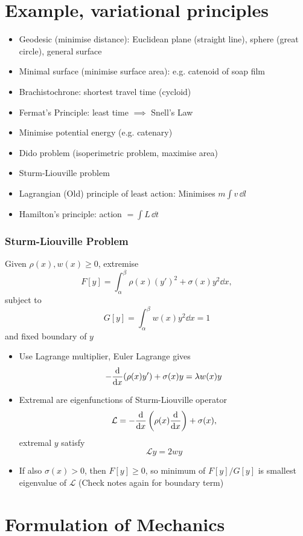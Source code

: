\section{Example, variational principles}
\begin{itemize}
    \item Geodesic (minimise distance): Euclidean plane (straight line), sphere (great circle), general surface
    \item Minimal surface (minimise surface area): e.g. catenoid of soap film
    \item Brachistochrone: shortest travel time (cycloid)
    \item Fermat's Principle: least time $\implies$ Snell's Law
    \item Minimise potential energy (e.g. catenary)
    \item Dido problem (isoperimetric problem, maximise area)
    \item Sturm-Liouville problem
    \item Lagrangian (Old) principle of least action: Minimises $m \int v \, \dd l$
    \item Hamilton's principle: action $= \int L \, \dd t$
\end{itemize}


\subsubsection*{Sturm-Liouville Problem}
Given $\rho(x), w(x) \geq 0$, extremise \[F[y] = \int_\alpha^\beta \rho(x) (y')^2 + \sigma(x) y^2 \dd x,\] subject to \[G[y] = \int_\alpha^\beta w(x)y^2 \dd{x} = 1\] and fixed boundary of $y$

\begin{itemize}
    \item Use Lagrange multiplier, Euler Lagrange gives \[ - \frac{\mathrm{d}{}}{\mathrm{d}{x}} (\rho(x) y') + \sigma(x) y = \lambda w(x) y\]
    \item Extremal are eigenfunctions of Sturm-Liouville operator \[\mathcal{L} = - \frac{\mathrm{d}{}}{\mathrm{d}{x}} \left( \rho(x) \frac{\mathrm{d}{}}{\mathrm{d}{x}} \right) + \sigma(x),\] extremal $y$ satisfy \[\mathcal{L}y = 2wy\]
    \item If also $\sigma(x) > 0$, then $F[y] \geq 0$, so minimum of $F[y]/G[y]$ is smallest eigenvalue of $\mathcal{L}$ (Check notes again for boundary term)
\end{itemize}

\section{Formulation of Mechanics}
